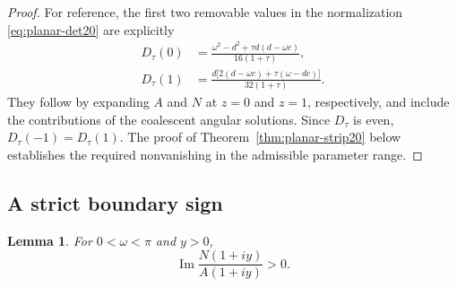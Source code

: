 \documentclass[11pt,a4paper]{article}
\newtheorem{lemma}[theorem]{Lemma}
\theoremstyle{remark}
\numberwithin{equation}{section}
\begin{document}
\begin{proof}
For reference, the first two removable values in the normalization
\eqref{eq:planar-det20} are explicitly
\begin{equation}\label{eq:planar-removable-endpoints}
 \begin{aligned}
 D_\tau(0)
  &=\frac{\omega^2-d^2+\tau d(d-\omega c)}{16(1+\tau)},\\
 D_\tau(1)
  &=\frac{d\bigl[2(d-\omega c)+\tau(\omega-dc)\bigr]}{32(1+\tau)}.
 \end{aligned}
\end{equation}
They follow by expanding $A$ and $N$ at $z=0$ and $z=1$,
respectively, and include the contributions of the coalescent angular
solutions. Since $D_\tau$ is even, $D_\tau(-1)=D_\tau(1)$. The proof of Theorem~\ref{thm:planar-strip20} below
establishes the required nonvanishing in the admissible parameter range.
\end{proof}

\subsection{A strict boundary sign}

\begin{lemma}\label{lem:planar-sign20}
For $0<\omega<\pi$ and $y>0$,
\[
 \operatorname{Im}\frac{N(1+iy)}{A(1+iy)}>0.
\]
\end{lemma}
\end{document}
